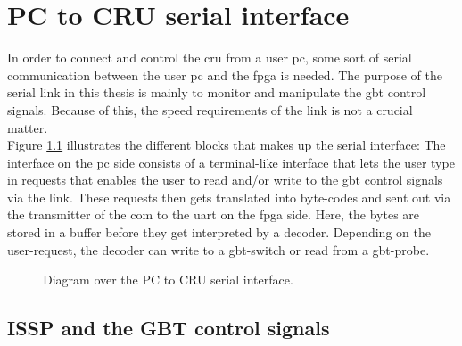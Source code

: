 \documentclass[main.tex]{subfiles}
\begin{document}
\chapter{PC to CRU serial interface} \label{chap:sercom}

In order to connect and control the \gls{cru} from a user \acrshort{pc}, some sort of serial communication between the user \acrshort{pc} and the \gls{fpga} is needed. The purpose of the serial link in this thesis is mainly to monitor and manipulate the \gls{gbt} control signals. Because of this, the speed requirements of the link is not a crucial matter. \\
Figure \ref{fig:sergui} illustrates the different blocks that makes up the serial interface: The interface on the \gls{pc} side consists of a terminal-like interface that lets the user type in requests that enables the user to read and/or write to the \gls{gbt} control signals via the link. These requests then gets translated into byte-codes and sent out via the transmitter of the \gls{com} to the \gls{uart} on the fpga side. Here, the bytes are stored in a buffer before they get interpreted by a decoder. Depending on the user-request, the decoder can write to a \gls{gbt}-switch or read from a \gls{gbt}-probe.

\begin{figure}[H] %

\caption{Diagram over the PC to CRU serial interface.}
\label{fig:sergui}
\end{figure}

\section{ISSP and the GBT control signals}
\end{document}
